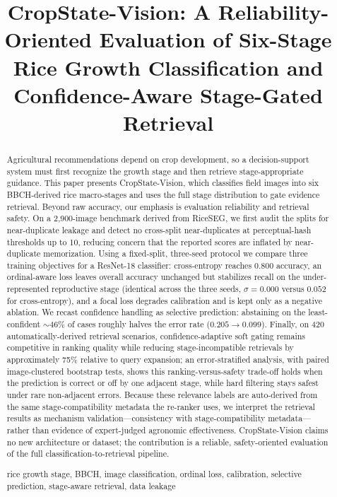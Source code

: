 \documentclass[conference]{IEEEtran}
\begin{document}
\title{CropState-Vision: A Reliability-Oriented Evaluation of Six-Stage Rice Growth
Classification and Confidence-Aware Stage-Gated Retrieval}

\author{
}

\maketitle

\begin{abstract}
Agricultural recommendations depend on crop development, so a decision-support system must first recognize the growth stage and then retrieve stage-appropriate guidance. This paper presents CropState-Vision, which classifies field images into six BBCH-derived rice macro-stages and uses the full stage distribution to gate evidence retrieval. Beyond raw accuracy, our emphasis is evaluation reliability and retrieval safety. On a 2{,}900-image benchmark derived from RiceSEG, we first audit the splits for near-duplicate leakage and detect no cross-split near-duplicates at perceptual-hash thresholds up to 10, reducing concern that the reported scores are inflated by near-duplicate memorization. Using a fixed-split, three-seed protocol we compare three training objectives for a ResNet-18 classifier: cross-entropy reaches 0.800 accuracy, an ordinal-aware loss leaves overall accuracy unchanged but stabilizes recall on the under-represented reproductive stage (identical across the three seeds, $\sigma=0.000$ versus $0.052$ for cross-entropy), and a focal loss degrades calibration and is kept only as a negative ablation. We recast confidence handling as selective prediction: abstaining on the least-confident ${\sim}46\%$ of cases roughly halves the error rate ($0.205\to0.099$). Finally, on 420 automatically-derived retrieval scenarios, confidence-adaptive soft gating remains competitive in ranking quality while reducing stage-incompatible retrievals by approximately 75\% relative to query expansion; an error-stratified analysis, with paired image-clustered bootstrap tests, shows this ranking-versus-safety trade-off holds when the prediction is correct or off by one adjacent stage, while hard filtering stays safest under rare non-adjacent errors. Because these relevance labels are auto-derived from the same stage-compatibility metadata the re-ranker uses, we interpret the retrieval results as mechanism validation---consistency with stage-compatibility metadata---rather than evidence of expert-judged agronomic effectiveness. CropState-Vision claims no new architecture or dataset; the contribution is a reliable, safety-oriented evaluation of the full classification-to-retrieval pipeline.

\begin{IEEEkeywords}
rice growth stage, BBCH, image classification, ordinal loss, calibration,
selective prediction, stage-aware retrieval, data leakage
\end{IEEEkeywords}
\end{abstract}
\end{document}
